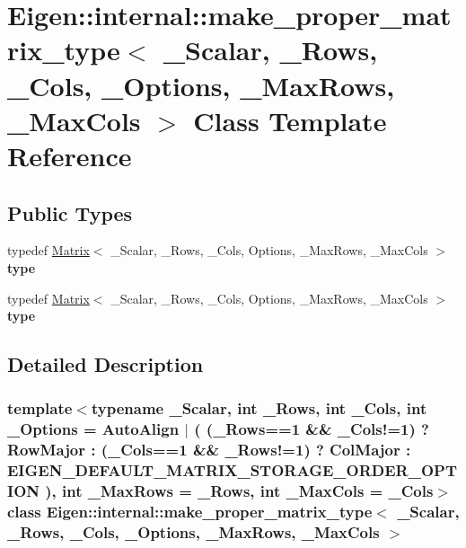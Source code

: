 \hypertarget{class_eigen_1_1internal_1_1make__proper__matrix__type}{}\section{Eigen\+:\+:internal\+:\+:make\+\_\+proper\+\_\+matrix\+\_\+type$<$ \+\_\+\+Scalar, \+\_\+\+Rows, \+\_\+\+Cols, \+\_\+\+Options, \+\_\+\+Max\+Rows, \+\_\+\+Max\+Cols $>$ Class Template Reference}
\label{class_eigen_1_1internal_1_1make__proper__matrix__type}
\subsection*{Public Types}
\begin{DoxyCompactItemize}
\item 
\mbox{\label{class_eigen_1_1internal_1_1make__proper__matrix__type_abf151c04157051de10e26fcca2bea915}} 
typedef \hyperlink{group___core___module_class_eigen_1_1_matrix}{Matrix}$<$ \+\_\+\+Scalar, \+\_\+\+Rows, \+\_\+\+Cols, Options, \+\_\+\+Max\+Rows, \+\_\+\+Max\+Cols $>$ {\bfseries type}
\item 
\mbox{\label{class_eigen_1_1internal_1_1make__proper__matrix__type_abf151c04157051de10e26fcca2bea915}} 
typedef \hyperlink{group___core___module_class_eigen_1_1_matrix}{Matrix}$<$ \+\_\+\+Scalar, \+\_\+\+Rows, \+\_\+\+Cols, Options, \+\_\+\+Max\+Rows, \+\_\+\+Max\+Cols $>$ {\bfseries type}
\end{DoxyCompactItemize}


\subsection{Detailed Description}
\subsubsection*{template$<$typename \+\_\+\+Scalar, int \+\_\+\+Rows, int \+\_\+\+Cols, int \+\_\+\+Options = Auto\+Align $\vert$ ( (\+\_\+\+Rows==1 \&\& \+\_\+\+Cols!=1) ? Row\+Major                          \+: (\+\_\+\+Cols==1 \&\& \+\_\+\+Rows!=1) ? Col\+Major                          \+: E\+I\+G\+E\+N\+\_\+\+D\+E\+F\+A\+U\+L\+T\+\_\+\+M\+A\+T\+R\+I\+X\+\_\+\+S\+T\+O\+R\+A\+G\+E\+\_\+\+O\+R\+D\+E\+R\+\_\+\+O\+P\+T\+I\+O\+N ), int \+\_\+\+Max\+Rows = \+\_\+\+Rows, int \+\_\+\+Max\+Cols = \+\_\+\+Cols$>$\newline
class Eigen\+::internal\+::make\+\_\+proper\+\_\+matrix\+\_\+type$<$ \+\_\+\+Scalar, \+\_\+\+Rows, \+\_\+\+Cols, \+\_\+\+Options, \+\_\+\+Max\+Rows, \+\_\+\+Max\+Cols $>$}



